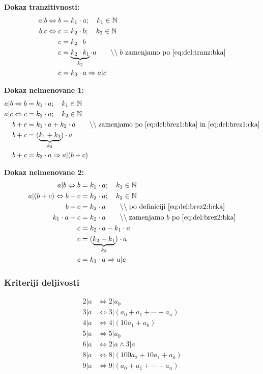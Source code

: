 \documentclass[a4paper,oneside,12pt,fleqn]{article}
\def\N{\ensuremath{\mathbb N}}
\newcommand\krat\cdot
\newcommand{\comment}[1]{\ensuremath{\qquad\backslash\backslash\;}\textnormal{#1}}
\renewcommand\implies\Rightarrow
\renewcommand\iff\Leftrightarrow
\numberwithin{equation}{section}
\begin{document}
\textbf{Dokaz tranzitivnosti:}
\begin{align}
  a|b \iff b &= k_1 \krat a; \quad k_1 \in \N \label{eq:del:tranz:bka} \\
  b|c \iff c &= k_2 \krat b; \quad k_2 \in \N \label{eq:del:tranz:ckb} \\
  c &= k_2 \krat b \\
  c &= \underbrace{k_2 \krat k_1}_{k_3} \krat a \comment{$b$ zamenjamo po \eqref{eq:del:tranz:bka}} \\
  c &= k_3 \krat a \implies a|c
\end{align}

\textbf{Dokaz neimenovane 1:}
\begin{align}
  a|b \iff b &= k_1 \krat a; \quad k_1 \in \N \label{eq:del:brez1:bka} \\
  a|c \iff c &= k_2 \krat a; \quad k_2 \in \N \label{eq:del:brez1:cka} \\
  b + c &= k_1 \krat a + k_2 \krat a \comment{zamenjamo po \eqref{eq:del:brez1:bka} in
  \eqref{eq:del:brez1:cka}} \\
  b + c &= (\underbrace{k_1 + k_2}_{k_3}) \krat a \\
  b + c &= k_3 \krat a \implies a|(b+c)
\end{align}

\textbf{Dokaz neimenovane 2:}
\begin{align}
  a|b \iff b &= k_1 \krat a; \quad k_1 \in \N \label{eq:del:brez2:bka} \\
  a|(b+c) \iff b+c &= k_2 \krat a; \quad k_2 \in \N \label{eq:del:brez2:bcka} \\
  b + c &= k_2 \krat a \comment{po definiciji \eqref{eq:del:brez2:bcka}} \\
  k_1 \krat a + c &= k_2 \krat a \comment{zamenjamo $b$ po \eqref{eq:del:brez2:bka}} \\
  c &= k_2 \krat a - k_1 \krat a \\
  c &= (\underbrace{k_2 - k_1}_{k_3}) \krat a \\
  c &= k_3 \krat a \implies a|c
\end{align}

\subsubsection{Kriteriji deljivosti}
\vspace{-1ex}
\begin{align*}
  2|a &\iff 2|a_0 \\
  3|a &\iff 3|(a_0 + a_1 + \cdots + a_n) \\
  4|a &\iff 4|(10a_1+a_0) \\
  5|a &\iff 5|a_0 \\
  6|a &\iff 2|a \land 3|a \\
  8|a &\iff 8|(100a_2 + 10a_1+a_0) \\
  9|a &\iff 9|(a_0 + a_1 + \cdots + a_n) 
\end{align*}
\end{document}
